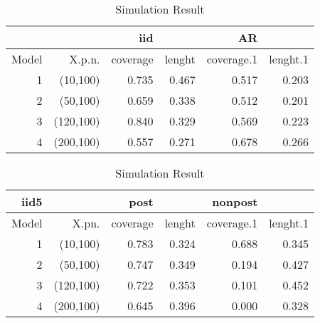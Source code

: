 \documentclass[11pt,oneside, a4paper]{amsart}\usepackage[]{graphicx}\usepackage[]{color}
\begin{document}
\begin{table}[ht]
\centering
\caption{Simulation Result} 
\label{Test_table}
{\footnotesize
\begin{tabular}{|r|r|rr|rr|}
  \toprule 
    &  & iid &  & AR &  \\
 \midrule 
Model & X.p.n. & coverage & lenght & coverage.1 & lenght.1 \\ 
    1 & (10,100) & 0.735 & 0.467 & 0.517 & 0.203 \\ 
     2 & (50,100) & 0.659 & 0.338 & 0.512 & 0.201 \\ 
     3 & (120,100) & 0.840 & 0.329 & 0.569 & 0.223 \\ 
     4 & (200,100) & 0.557 & 0.271 & 0.678 & 0.266 \\ 
   \bottomrule 
\end{tabular}
}
\end{table}








\begin{table}[ht]
\centering
\caption{Simulation Result} 
\label{Test_table}
{\footnotesize
\begin{tabular}{|r|r|rr|rr|}
  \toprule 
   iid5 &  & post & & nonpost &  \\
 \midrule 
Model & X.pn. & coverage & lenght & coverage.1 & lenght.1 \\ 
    1 & (10,100) & 0.783 & 0.324 & 0.688 & 0.345 \\ 
     2 & (50,100) & 0.747 & 0.349 & 0.194 & 0.427 \\ 
     3 & (120,100) & 0.722 & 0.353 & 0.101 & 0.452 \\ 
     4 & (200,100) & 0.645 & 0.396 & 0.000 & 0.328 \\ 
   \bottomrule 
\end{tabular}
}
\end{table}
\end{document}
